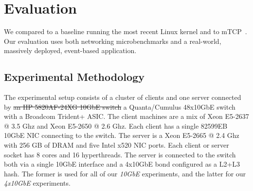 
\section{Evaluation}
\label{sec:eval}

We compared \ix to a baseline running the most recent Linux kernel and to
mTCP~\cite{jeong2014mtcp}. Our evaluation uses both networking
microbenchmarks and a real-world, massively deployed, event-based
application.

\subsection{Experimental Methodology}
\label{sec:eval:setup}



 





The experimental setup consists of a cluster of  clients
and one server connected by \sout{an HP 5820AF-24XG 10GbE switch} 
a Quanta/Cumulus 48x10GbE switch with a Broadcom Trident+ ASIC.
The client machines are a mix of Xeon E5-2637 @ 3.5 Ghz and Xeon
E5-2650 @ 2.6 Ghz.  Each client has a single 82599EB 10GbE NIC
connecting to the switch.  The server is a Xeon E5-2665 @ 2.4 Ghz with
256 GB of DRAM and five Intel x520 NIC ports.  Each client or server
socket has 8 cores and 16 hyperthreads.  The server is connected
to the switch both via a single 10GbE interface and a 4x10GbE bond configured as a L2+L3 hash.  The former is used for all of our \emph{10GbE} experiments, and the latter for our \emph{4x10GbE} experiments. 

